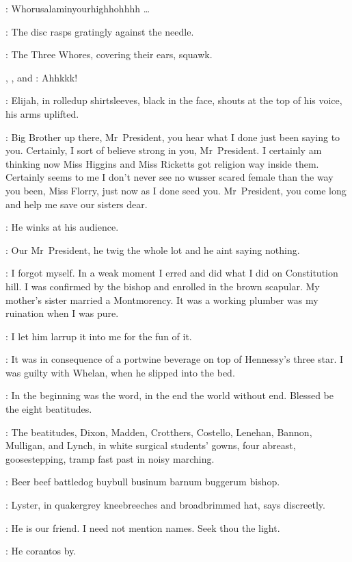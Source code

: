 \Gramophone:
Whorusalaminyourhighhohhhh \ldots

:
The disc rasps gratingly against the needle.

:
The Three Whores,
covering their ears,
squawk.

\Zoe,
\Kitty,
and \Florry:
Ahhkkk!

:
Elijah,
in rolledup shirtsleeves,
black in the face,
shouts at the top of his voice,
his arms uplifted.

\Elijah:
Big Brother up there,
Mr~President,
you hear what I done just been saying to you.
Certainly,
I sort of believe strong in you,
Mr~President.
I certainly am thinking now
Miss Higgins and Miss Ricketts got religion way inside them.
Certainly seems to me I don't never see no wusser scared female
than the way you been,
Miss Florry,
just now as I done seed you.
Mr~President,
you come long and help me save our sisters dear.

:
He winks at his audience.

\Elijah:
Our Mr~President,
he twig the whole lot and he aint saying nothing.

\KittyKate[2]:
I forgot myself.
In a weak moment I erred and did what I did on Constitution hill.
I was confirmed by the bishop and enrolled in the brown scapular.
My mother's sister married a Montmorency.
It was a working plumber was my ruination when I was pure.

\ZoeFanny[2]:
I let him larrup it into me for the fun of it.

\FlorryTeresa[2]:
It was in consequence of a portwine beverage on top of Hennessy's three star.
I was guilty with Whelan,
when he slipped into the bed.

\Stephen[1]:
In the beginning was the word,
in the end the world without end.
Blessed be the eight beatitudes.

:
The beatitudes,
Dixon,
Madden,
Crotthers,
Costello,
Lenehan,
Bannon,
Mulligan,
and Lynch,
in white surgical students' gowns,
four abreast,
goosestepping,
tramp fast past in noisy marching.

\Beatitudes:
Beer beef battledog buybull businum barnum buggerum bishop.

:
Lyster,
in quakergrey kneebreeches and broadbrimmed hat,
says discreetly.

\Lyster:
He is our friend.
I need not mention names.
Seek thou the light.

:
He corantos by.

